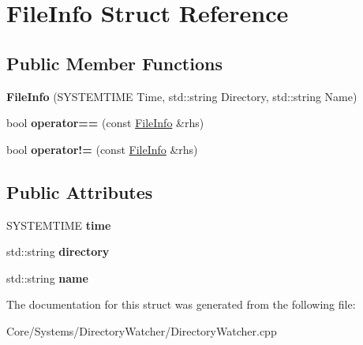 \hypertarget{structFileInfo}{\section{File\-Info Struct Reference}
\label{structFileInfo}
}
\subsection*{Public Member Functions}
\begin{DoxyCompactItemize}
\item 
\hypertarget{structFileInfo_a77a7f28d44263bda4746e7cfb5b061cf}{{\bfseries File\-Info} (S\-Y\-S\-T\-E\-M\-T\-I\-M\-E Time, std\-::string Directory, std\-::string Name)}\label{structFileInfo_a77a7f28d44263bda4746e7cfb5b061cf}

\item 
\hypertarget{structFileInfo_a7ebe687eecd19abce11aeff9a0c0087b}{bool {\bfseries operator==} (const \hyperlink{structFileInfo}{File\-Info} \&rhs)}\label{structFileInfo_a7ebe687eecd19abce11aeff9a0c0087b}

\item 
\hypertarget{structFileInfo_a7ffeb64fa314b7ae5f66e60b7b41fa64}{bool {\bfseries operator!=} (const \hyperlink{structFileInfo}{File\-Info} \&rhs)}\label{structFileInfo_a7ffeb64fa314b7ae5f66e60b7b41fa64}

\end{DoxyCompactItemize}
\subsection*{Public Attributes}
\begin{DoxyCompactItemize}
\item 
\hypertarget{structFileInfo_a78e9ecd272be65e78cd0c26910d0d2ca}{S\-Y\-S\-T\-E\-M\-T\-I\-M\-E {\bfseries time}}\label{structFileInfo_a78e9ecd272be65e78cd0c26910d0d2ca}

\item 
\hypertarget{structFileInfo_a86a6cbb821b0fe4742adb3d493630304}{std\-::string {\bfseries directory}}\label{structFileInfo_a86a6cbb821b0fe4742adb3d493630304}

\item 
\hypertarget{structFileInfo_af3994a1fd65e430d0ea30bbf6aaaa515}{std\-::string {\bfseries name}}\label{structFileInfo_af3994a1fd65e430d0ea30bbf6aaaa515}

\end{DoxyCompactItemize}


The documentation for this struct was generated from the following file\-:\begin{DoxyCompactItemize}
\item 
Core/\-Systems/\-Directory\-Watcher/Directory\-Watcher.\-cpp\end{DoxyCompactItemize}
